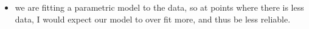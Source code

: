 \documentclass[12pt,twoside]{article}
\begin{document}
\begin{enumerate}
\begin{enumerate}
\begin{itemize}
    \item we are fitting a parametric model to the data, so at points where there is less data, I would expect our model to over fit more, and thus be less reliable. 
    
\end{itemize}

\end{enumerate}


\end{enumerate}
\end{document}
